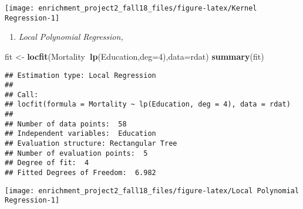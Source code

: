 \documentclass[]{article}
\newenvironment{Shaded}{\begin{snugshade}}{\end{snugshade}}
\newcommand{\KeywordTok}[1]{\textcolor[rgb]{0.13,0.29,0.53}{\textbf{#1}}}
\newcommand{\DataTypeTok}[1]{\textcolor[rgb]{0.13,0.29,0.53}{#1}}
\newcommand{\DecValTok}[1]{\textcolor[rgb]{0.00,0.00,0.81}{#1}}
\newcommand{\FloatTok}[1]{\textcolor[rgb]{0.00,0.00,0.81}{#1}}
\newcommand{\StringTok}[1]{\textcolor[rgb]{0.31,0.60,0.02}{#1}}
\newcommand{\OperatorTok}[1]{\textcolor[rgb]{0.81,0.36,0.00}{\textbf{#1}}}
\newcommand{\NormalTok}[1]{#1}
\providecommand{\tightlist}{%
  \setlength{\itemsep}{0pt}\setlength{\parskip}{0pt}}
\begin{document}
\begin{center}\texttt{[image: enrichment\_project2\_fall18\_files/figure-latex/Kernel Regression-1]} \end{center}

\begin{enumerate}
\def\labelenumi{\arabic{enumi})}
\setcounter{enumi}{1}
\tightlist
\item
  \emph{Local Polynomial Regression,}
\end{enumerate}

\begin{Shaded}
\begin{Highlighting}[]
\NormalTok{fit <-}\StringTok{ }\KeywordTok{locfit}\NormalTok{(Mortality}\OperatorTok{~}\KeywordTok{lp}\NormalTok{(Education,}\DataTypeTok{deg=}\DecValTok{4}\NormalTok{),}\DataTypeTok{data=}\NormalTok{rdat)}
\KeywordTok{summary}\NormalTok{(fit)}
\end{Highlighting}
\end{Shaded}

\begin{verbatim}
## Estimation type: Local Regression 
## 
## Call:
## locfit(formula = Mortality ~ lp(Education, deg = 4), data = rdat)
## 
## Number of data points:  58 
## Independent variables:  Education 
## Evaluation structure: Rectangular Tree 
## Number of evaluation points:  5 
## Degree of fit:  4 
## Fitted Degrees of Freedom:  6.982
\end{verbatim}

\begin{Shaded}
\end{Shaded}

\begin{center}\texttt{[image: enrichment\_project2\_fall18\_files/figure-latex/Local Polynomial Regression-1]} \end{center}

\begin{Shaded}
\end{Shaded}
\end{document}
